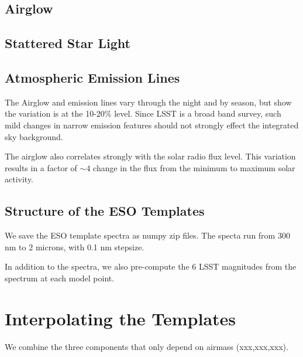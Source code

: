 \documentclass{emulateapj}  %
\begin{document}
\subsection{Airglow}



\subsection{Stattered Star Light}



\subsection{Atmospheric Emission Lines}

The Airglow and emission lines vary through the night and by season, but \citet{Noll12} show the variation is at the 10-20\% level.  Since LSST is a broad band survey, such mild changes in narrow emission features should not strongly effect the integrated sky background.

The airglow also correlates strongly with the solar radio flux level.  This variation results in a factor of $\sim4$ change in the flux from the minimum to maximum solar activity.  





\subsection{Structure of the ESO Templates}

We save the ESO template spectra as numpy zip files.  The specta run from 300 nm to 2 microns, with 0.1 nm stepsize.

In addition to the spectra, we also pre-compute the 6 LSST magnitudes from the spectrum at each model point.

\section{Interpolating the Templates}

We combine the three components that only depend on airmass (xxx,xxx,xxx).
\end{document}

